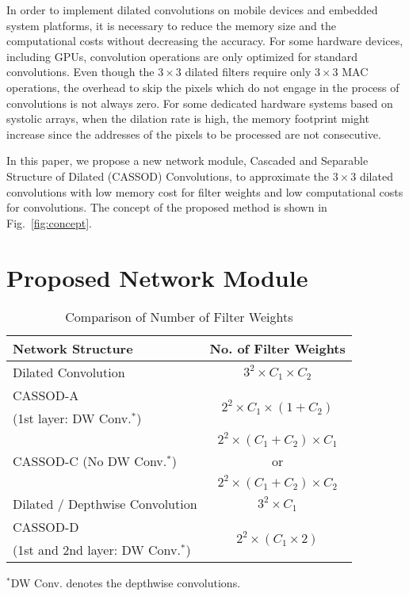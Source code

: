 \documentclass[10pt,twocolumn,letterpaper]{article}
\begin{document}
In order to implement dilated convolutions on mobile devices and embedded system platforms, it is necessary to reduce the memory size and the computational costs without decreasing the accuracy. For some hardware devices, including GPUs, convolution operations are only optimized for standard convolutions. Even though the $3 \times 3$ dilated filters require only $3 \times 3$ MAC operations, the overhead to skip the pixels which do not engage in the process of convolutions is not always zero. For some dedicated hardware systems based on systolic arrays, when the dilation rate is high, the memory footprint might increase since the addresses of the pixels to be processed are not consecutive.

In this paper, we propose a new network module, Cascaded and Separable Structure of Dilated (CASSOD) Convolutions, to approximate the $3 \times 3$ dilated convolutions with low memory cost for filter weights and low computational costs for convolutions. The concept of the proposed method is shown in Fig.~\ref{fig:concept}.





\section{Proposed Network Module}
\label{sec:module}

\begin{table}
\caption{Comparison of Number of Filter Weights}
\begin{center}
\begin{tabular}{l|c}
\hline
Network Structure &  No. of Filter Weights \\
\hline
Dilated Convolution  & $3^{2} \times C_{1} \times C_{2}$\\
\hline
CASSOD-A             & \multirow{2}{*}{$2^{2} \times C_{1} \times (1 + C_{2})$}  \\
(1st layer: DW Conv.$^{*}$)\\
\hline
\multirow{3}{*}{CASSOD-C (No DW Conv.$^{*}$)}  & $2^{2} \times (C_{1} + C_{2}) \times C_{1}$  \\
                     &  or     \\
                     & $2^{2} \times (C_{1} + C_{2}) \times C_{2}$  \\
\hline
Dilated / Depthwise Convolution  & $3^{2} \times C_{1}$\\
\hline
CASSOD-D             & \multirow{2}{*}{$2^{2} \times  (C_{1} \times 2)$}  \\
(1st and 2nd layer: DW Conv.$^{*}$)\\           
\hline
\end{tabular}
\end{center}
{\footnotesize
$^{*}$DW Conv. denotes the depthwise convolutions.\\
}
\label{tab:weights}
\end{table}
\end{document}
